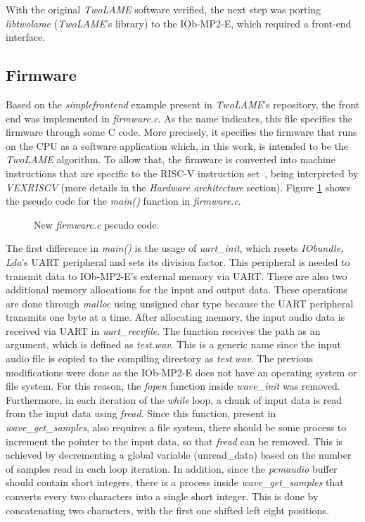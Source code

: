 With the original \textit{TwoLAME} software verified, the next step was porting \textit{libtwolame} (\textit{TwoLAME}'s library) to the IOb-MP2-E, which required a front-end interface.

\subsection{Firmware}

Based on the \textit{simplefrontend} example present in \textit{TwoLAME}'s repository, the front end was implemented in \textit{firmware.c}. As the name indicates, this file specifies the firmware through some C code. More precisely, it specifies the firmware that runs on the CPU as a software application which, in this work, is intended to be the \textit{TwoLAME} algorithm. To allow that, the firmware is converted into machine instructions that are specific to the RISC-V instruction set~\cite{bib:riscvmanual_iieec}, being interpreted by \textit{VEXRISCV} (more details in the \textit{Hardware architecture} section). 
Figure \ref{newpseudo} shows the pseudo code for the \textit{main()} function in \textit{firmware.c}.

\begin{figure}[H]
\centerline{}
\caption{New \textit{firmware.c} pseudo code.}
\label{newpseudo}
\end{figure}

The first difference in \textit{main()} is the usage of \textit{uart\_init}, which resets \textit{IObundle, Lda}’s UART peripheral and sets its division factor. This peripheral is needed to transmit data to IOb-MP2-E's external memory via UART. 
There are also two additional memory allocations for the input and output data. These operations are done through \textit{malloc} using unsigned char type because the UART peripheral transmits one byte at a time.
After allocating memory, the input audio data is received via UART in \textit{uart\_recvfile}. The function receives the path as an argument, which is defined as \textit{test.wav}. This is a generic name since the input audio file is copied to the compiling directory as \textit{test.wav}.
The previous modifications were done as the IOb-MP2-E does not have an operating system or file system. For this reason, the \textit{fopen} function inside \textit{wave\_init} was removed. Furthermore, in each iteration of the \textit{while} loop, a chunk of input data is read from the input data using \textit{fread}. Since this function, present in \textit{wave\_get\_samples}, also requires a file system, there should be some process to increment the pointer to the input data, so that \textit{fread} can be removed. This is achieved by decrementing a global variable (unread\_data) based on the number of samples read in each loop iteration. In addition, since the \textit{pcmaudio} buffer should contain short integers, there is a process inside \textit{wave\_get\_samples} that converts every two characters into a single short integer. This is done by concatenating two characters, with the first one shifted left eight positions.

